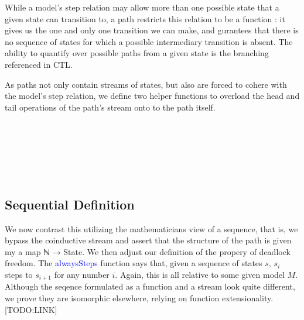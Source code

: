 \documentclass[a4paper, 11pt]{article}
\newcommand{\blue}[1]{\textcolor{blue}{#1}}
\begin{document}
While a model's step relation may allow more than one possible state that a
given state can transition to, a path restricts this relation to be a function :
it gives us the one and only one transition we can make, and gurantees that
there is no sequence of states for which a possible intermediary transition is
absent. The ability to quantify over possible paths from a given state is the
branching referenced in CTL.

As paths not only contain streams of states, but also are forced to cohere with
the model's step relation, we define two helper functions to overload the head
and tail operations of the path's stream onto to the path itself.

\begin{code}%
%
\>[2]\AgdaSpace{}%
\AgdaSymbol{:}\AgdaSpace{}%
\AgdaSpace{}%
\AgdaSpace{}%
\<%
\\
%
\>[2]\AgdaSpace{}%
\AgdaSpace{}%
\AgdaSymbol{=}\AgdaSpace{}%
\AgdaSpace{}%
\AgdaSymbol{(}\AgdaSpace{}%
\AgdaSymbol{)}\<%
\\
%
\\[\AgdaEmptyExtraSkip]%
%
\>[2]\AgdaSpace{}%
\AgdaSymbol{:}\AgdaSpace{}%
\AgdaSpace{}%
\AgdaSpace{}%
\<%
\\
%
\>[2]\AgdaSpace{}%
\AgdaSpace{}%
%
\>[29]\AgdaSymbol{=}\AgdaSpace{}%
\AgdaSpace{}%
\AgdaSymbol{(}\AgdaSpace{}%
\AgdaSymbol{)}\<%
\\
%
\>[2]\AgdaSpace{}%
\AgdaSpace{}%
\AgdaSpace{}%
\AgdaSymbol{=}\AgdaSpace{}%
\AgdaSpace{}%
\AgdaSymbol{(}\AgdaSpace{}%
\AgdaSymbol{)}\<%
\end{code}


\subsection{Sequential Definition}

We now contrast this utilizing the mathematicians view of a sequence, that is,
we bypass the coinductive stream and assert that the structure of the path is
given my a map ℕ → State. We then adjust our definition of the propery of
deadlock freedom. The \blue{alwaysSteps} function says that, given a sequence of
states $s$, $s_i$ steps to $s_{i+1}$ for any number $i$. Again, this is all
relative to some given model $M$. Although the seqence formulated as a function
and a stream look quite different, we prove they are isomorphic elsewhere,
relying on function extensionality. [TODO:LINK]
\end{document}
